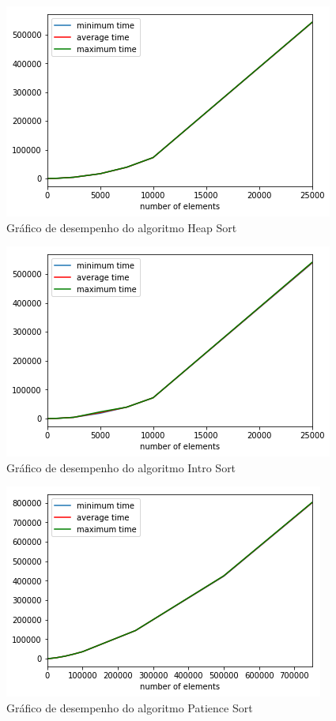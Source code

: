 \documentclass[a4paper,12pt]{scrartcl}
\begin{document}
\begin{figure}[H]
\centering
\includegraphics[scale=.75]{images/heapsort.png}
\caption{Gráfico de desempenho do algoritmo Heap Sort}
\label{mapaHeap}
\end{figure}

\begin{figure}[H]
\centering
\includegraphics[scale=.75]{images/introsort.png}
\caption{Gráfico de desempenho do algoritmo Intro Sort}
\label{mapaIntro}
\end{figure}

\begin{figure}[H]
\centering
\includegraphics[scale=.75]{images/patiencesort.png}
\caption{Gráfico de desempenho do algoritmo Patience Sort}
\label{mapaPatience}
\end{figure}
\end{document}
